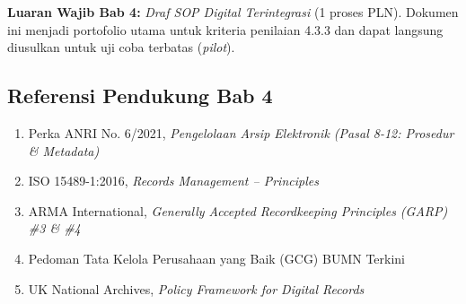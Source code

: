 \documentclass[12pt,a4paper]{report}
\begin{document}
\begin{outputbox}
\textbf{Luaran Wajib Bab 4:} \textit{Draf SOP Digital Terintegrasi} (1 proses PLN). Dokumen ini menjadi portofolio utama untuk kriteria penilaian 4.3.3 dan dapat langsung diusulkan untuk uji coba terbatas (\textit{pilot}).
\end{outputbox}

\subsection*{Referensi Pendukung Bab 4}
\begin{enumerate}[leftmargin=*, nosep]
    \item Perka ANRI No. 6/2021, \textit{Pengelolaan Arsip Elektronik (Pasal 8-12: Prosedur \& Metadata)}
    \item ISO 15489-1:2016, \textit{Records Management -- Principles}
    \item ARMA International, \textit{Generally Accepted Recordkeeping Principles (GARP) \#3 \& \#4}
    \item Pedoman Tata Kelola Perusahaan yang Baik (GCG) BUMN Terkini
    \item UK National Archives, \textit{Policy Framework for Digital Records}
\end{enumerate}
\end{document}
